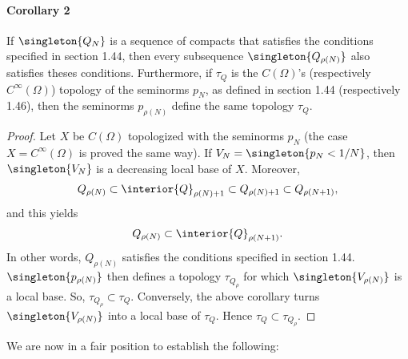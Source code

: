 \paragraph{Corollary 2}
If 
%
  $\singleton{Q_N}$ 
%
is a sequence of compacts that satisfies the conditions specified 
in section 1.44, then every subsequence 
%
  $\singleton{Q_{\rho(N)}}$ 
%
also satisfies theses conditions.
%
Furthermore, if $\tau_{Q}$ is the $C(\Omega)$'s 
(respectively $C^\infty (\Omega)$) topology of the seminorms $p_{N}$, 
as defined in section 1.44 (respectively 1.46), then the seminorms 
%
  $p_{\rho(N)}$ 
%
define the same topology $\tau_{Q}$.
%
\begin{proof}%
%
Let $X$ be $C(\Omega)$ topologized with the seminorms $p_{N}$ 
(the case $X=C^\infty(\Omega)$ is proved the same way).
%
If 
    $V_{N} = \singleton{p_{N} < 1/N}$, 
then 
    $\singleton{V_{N}}$ 
is a decreasing local base of $X$.
%
Moreover,
% 
  \begin{align}
    Q_{\rho(N)} 
      \subset 
    \interior{Q}_{\rho(N) + 1} 
      \subset 
    Q_{\rho(N) + 1} 
      \subset 
    Q_{\rho(N+ 1)},
  \end{align}
% 
and this yields
%
  \begin{align}
    Q_{\rho(N)} 
      \subset 
    \interior{Q}_{\rho(N+ 1)}.
  \end{align}
%
In other words, 
%
  $Q_{\rho(N)}$ satisfies the conditions specified in section 1.44.
%
%
  $\singleton{p_{\rho(N)}}$
% 
then defines a topology $\tau_{Q_\rho}$ for which  
% 
  $\singleton{V_{\rho(N)}}$ 
%
is a local base. So, 
% 
  $\tau_{Q_\rho} \subset \tau_{Q}$.
%
Conversely, the above corollary turns 
%
  $\singleton{V_{\rho(N)}}$ 
%
into a local base of $\tau_{Q}$. Hence  
%
  $\tau_{Q}\subset \tau_{Q_\rho}$.
%
\end{proof}
\noindent We are now in a fair position to establish the following:

